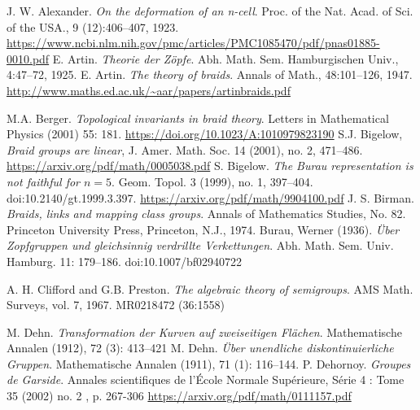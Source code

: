 \documentclass[TFG.tex]{subfiles}
\begin{document}
%

\begin{thebibliography}{}
 J. W. Alexander. \emph{On the deformation of an n-cell}. Proc. of the Nat.
Acad. of Sci. of the USA., 9 (12):406–407, 1923. \url{https://www.ncbi.nlm.nih.gov/pmc/articles/PMC1085470/pdf/pnas01885-0010.pdf}
 E. Artin. \emph{Theorie der Zöpfe}. Abh. Math. Sem. Hamburgischen Univ.,
4:47–72, 1925.
 E. Artin. \emph{The theory of braids}. Annals of Math., 48:101–126, 1947. \url{http://www.maths.ed.ac.uk/~aar/papers/artinbraids.pdf}

 M.A. Berger. \emph{Topological invariants in braid theory}.  Letters in Mathematical Physics (2001) 55: 181. \url{https://doi.org/10.1023/A:1010979823190}
 S.J. Bigelow, \emph{Braid groups are linear}, J. Amer. Math. Soc. 14 (2001), no. 2,
471–486. \url{https://arxiv.org/pdf/math/0005038.pdf}
 S. Bigelow. \emph{The Burau representation is not faithful for $n = 5$}. Geom. Topol. 3 (1999), no. 1, 397--404. doi:10.2140/gt.1999.3.397. 
\url{https://arxiv.org/pdf/math/9904100.pdf}
 J. S. Birman. \emph{Braids, links and mapping class groups}. Annals of Mathematics
Studies, No. 82. Princeton University Press, Princeton, N.J.,
1974.
 Burau, Werner (1936). \emph{Über Zopfgruppen und gleichsinnig verdrillte Verkettungen}. Abh. Math. Sem. Univ. Hamburg. 11: 179–186. doi:10.1007/bf02940722

  A. H. Clifford and G.B. Preston. \emph{The algebraic theory of semigroups}. AMS Math. Surveys,
vol. 7, 1967. MR0218472 (36:1558)

 M. Dehn. \emph{Transformation der Kurven auf zweiseitigen Flächen}. Mathematische Annalen (1912), 72 (3): 413–421
 M. Dehn. \emph{Über unendliche diskontinuierliche Gruppen}. Mathematische Annalen (1911), 71 (1): 116–144.
 P. Dehornoy. \emph{Groupes de Garside}. Annales scientifiques de l'École Normale Supérieure, Série 4 : Tome 35 (2002) no. 2 , p. 267-306 \url{https://arxiv.org/pdf/math/0111157.pdf}


\end{thebibliography}
\end{document}

